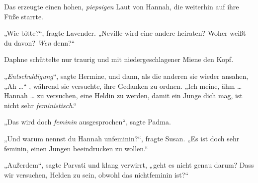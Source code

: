 Das erzeugte einen hohen, \emph{piepsigen} Laut von Hannah, die weiterhin auf ihre Füße starrte.

„Wie bitte?“, fragte Lavender.
„Neville wird eine andere heiraten? Woher weißt du davon? \emph{Wen} denn?“

Daphne schüttelte nur traurig und mit niedergeschlagener Miene den Kopf.

„\emph{Entschuldigung}“, sagte Hermine, und dann, als die anderen sie wieder ansahen,
„Ah …“ , während sie versuchte, ihre Gedanken zu ordnen.
„Ich meine, ähm … Hannah … zu versuchen, eine Heldin zu werden, damit ein Junge dich mag, ist nicht sehr \emph{feministisch}.“

„Das wird doch \emph{feminin} ausgesprochen“, sagte Padma.

„Und warum nennst du Hannah unfeminin?“, fragte Susan.
„Es ist doch sehr feminin, einen Jungen beeindrucken zu wollen.“

„Außerdem“, sagte Parvati und klang verwirrt, „geht es nicht genau darum? Dass wir versuchen, Helden zu sein, obwohl das nichtfeminin ist?“

